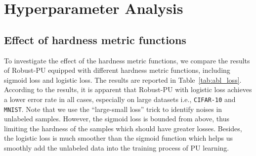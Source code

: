 \documentclass[sigconf]{acmart}
\newcommand{\ourmethod}{Robust-PU\xspace}
\begin{document}
\section{Hyperparameter Analysis}\label{sec:appendix}

\subsection{Effect of hardness metric functions}

\begin{table}[htbp]
    \caption{Classification errors of \ourmethod with different hardness metric functions (i.e. sigmoid loss and logistic loss).}
    \centering
    \label{tab:abl_loss}
\end{table}

To investigate the effect of the hardness metric functions, we compare the results of \ourmethod equipped with different hardness metric functions, including sigmoid loss and logistic loss. The results are reported in Table~\ref{tab:abl_loss}. According to the results, it is apparent that \ourmethod with logistic loss achieves a lower error rate in all cases, especially on large datasets i.e., \texttt{CIFAR-10} and \texttt{MNIST}. Note that we use the ``large-small loss'' trick to identify noises in unlabeled samples. However, the sigmoid loss is bounded from above, thus limiting the hardness of the samples which should have greater losses. Besides, the logistic loss is much smoother than the sigmoid function which helps us smoothly add the unlabeled data into the training process of PU learning.
\end{document}

